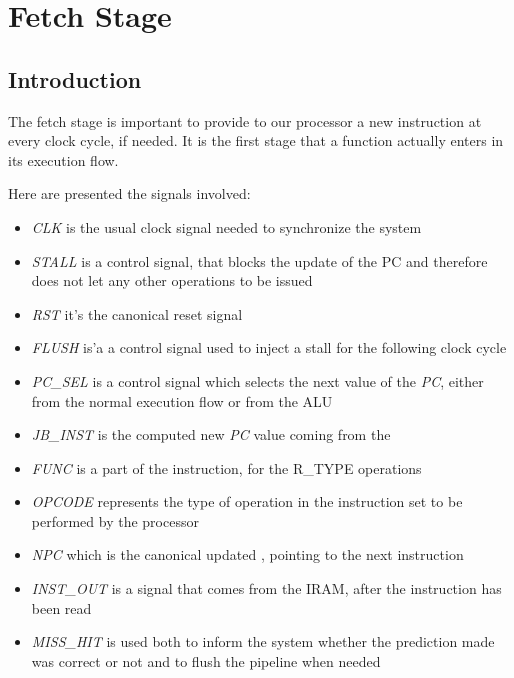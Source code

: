 \section{Fetch Stage}
\label{chap_ft}

\subsection{Introduction}
The fetch stage is important to provide to our processor a new instruction at every clock cycle, if needed. It is the first stage that a function actually enters in its execution flow.

Here are presented the signals involved:
\begin{itemize}
	\item \textit{CLK} is the usual clock signal needed to synchronize the system
	\item \textit{STALL} is a control signal, that blocks the update of the \textsf{PC} and therefore does not let any other operations to be issued
	\item \textit{RST} it's the canonical reset signal
	\item \textit{FLUSH} is'a a control signal used to inject a stall for the 
	following clock cycle
	\item \textit{PC\_SEL} is a control signal which selects the next value of the \textit{PC}, either from the normal execution flow or from the ALU
	\item \textit{JB\_INST} is the computed new \textit{PC} value coming from the \alu
	\item \textit{FUNC} is a part of the instruction, for the \textsc{R\_TYPE} operations
	\item \textit{OPCODE} represents the type of operation in the instruction set to be performed by the processor
	\item \textit{NPC} which is the canonical updated \pc, pointing to the next instruction
	\item \textit{INST\_OUT} is a signal that comes from the IRAM, after the instruction has been read
	\item \textit{MISS\_HIT} is used both to inform the system whether the 
	prediction made was correct or not and to flush the pipeline when needed

\end{itemize}

